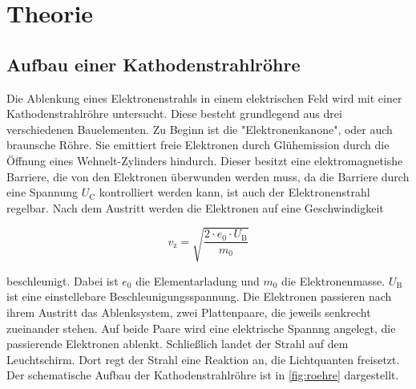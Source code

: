 \section{Theorie}
\label{sec:Theorie}




\subsection{Aufbau einer Kathodenstrahlröhre}
\label{ssec:t1}

Die Ablenkung eines Elektronenstrahls in einem elektrischen Feld wird mit einer Kathodenstrahlröhre untersucht.
Diese besteht grundlegend aus drei verschiedenen Bauelementen.
Zu Beginn ist die "Elektronenkanone", oder auch braunsche Röhre. Sie emittiert freie Elektronen durch Glühemission durch die Öffnung eines Wehnelt-Zylinders hindurch.
Dieser besitzt eine elektromagnetishe Barriere, die von den Elektronen überwunden werden muss, da die Barriere durch eine Spannung $U_\text{C}$ kontrolliert werden kann, ist auch der Elektronenstrahl regelbar.
Nach dem Austritt werden die Elektronen auf eine Geschwindigkeit 

\begin{equation}
    v_\text{z} = \sqrt{\frac{2 \cdot e_0 \cdot U_\text{B}}{m_0}}
    \label{eq:zges}
\end{equation}

beschleunigt.
Dabei ist $e_0$ die Elementarladung und $m_0$ die Elektronenmasse. 
$U_\text{B}$ ist eine einstellebare Beschleunigungsspannung.
Die Elektronen passieren nach ihrem Austritt das Ablenksystem, zwei Plattenpaare, die jeweils senkrecht zueinander stehen.
Auf beide Paare wird eine elektrische Spannng angelegt, die passierende Elektronen ablenkt.
Schließlich landet der Strahl auf dem Leuchtschirm.
Dort regt der Strahl eine Reaktion an, die Lichtquanten freisetzt.
Der schematische Aufbau der Kathodenstrahlröhre ist in \autoref{fig:roehre} dargestellt.

